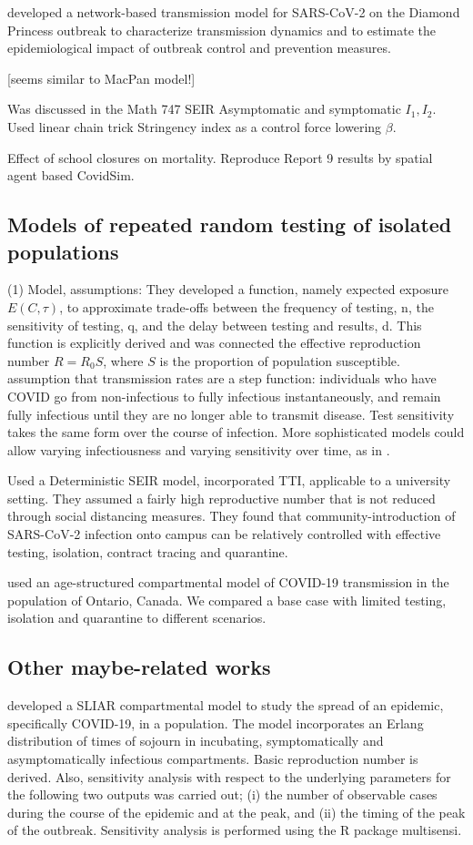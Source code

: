 \documentclass{article}
\begin{document}
\citep{jenness2020modeling} developed a network-based transmission model for SARS-CoV-2 on the Diamond Princess outbreak to characterize transmission dynamics and to estimate the epidemiological impact of outbreak control and prevention measures. 

\citep{elbanna2020entry} [seems similar to MacPan model!]

\citep{de2020influenza} Was discussed in the Math 747 
SEIR Asymptomatic and symptomatic $I_1, I_2$. Used linear chain trick 
Stringency index as a control force lowering $\beta$.

\citep{rice2020effect} Effect of school closures on mortality. Reproduce Report 9 results by spatial agent based CovidSim. 
\subsection{Models of repeated random testing of isolated populations}
\cite{bergstrom2020frequency}
(1) Model, assumptions: They developed a function, namely expected exposure $E(C,\tau)$, to approximate trade-offs between the frequency of testing, n, the sensitivity of testing, q, and the delay between
testing and results, d. This function is explicitly derived and was connected the effective reproduction number $R=R_0 S$, where $S$ is the proportion of population susceptible.
assumption that transmission rates are a step function: individuals who
have COVID go from non-infectious to fully infectious instantaneously,
and remain fully infectious until they are no longer able to transmit disease. Test sensitivity takes the same form over the course of infection.
More sophisticated models could allow varying infectiousness and varying
sensitivity over time, as in 
\citep{larremore2020test}.

\citep{lopman2020model} Used a Deterministic SEIR model, incorporated TTI, applicable to a university setting. They assumed a fairly high reproductive number that is not reduced through social
distancing measures. They found that community-introduction of SARS-CoV-2 infection onto campus can be
relatively controlled with effective testing, isolation, contract tracing and quarantine.

\citep{tuite2020mathematical} used an age-structured compartmental model of COVID-19 transmission in the population of Ontario, Canada. We compared a base case with limited testing, isolation and quarantine to different scenarios. 
\subsection{Other maybe-related works}
\citep{arino2020simple} developed a SLIAR compartmental model to study the spread of an epidemic, specifically COVID-19, in a population. The model incorporates an Erlang distribution of times of sojourn in incubating, symptomatically and asymptomatically infectious compartments. Basic reproduction number is derived. Also, sensitivity analysis with respect to the underlying parameters for the following two outputs was carried out; (i) the number of observable cases during the course of the epidemic and at the peak, and (ii) the timing of the peak of the outbreak. Sensitivity analysis is performed using the R package multisensi.
\end{document}
